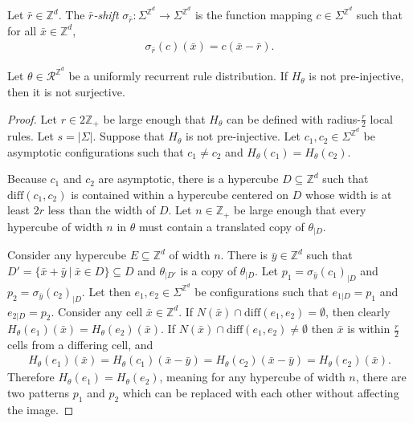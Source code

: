 \documentclass[runningheads]{llncs}
\newcommand{\Z}{\mathbb{Z}}
\newcommand{\set}[2]{\{ #1 \: | \: #2 \}}
\newcommand{\confspace}{\Sigma^{\Z^d}}
\begin{document}
\begin{definition}
Let $\bar r \in \Z^d$. The \emph{$\bar r$-shift} $\sigma_{\bar r}: \confspace \rightarrow \confspace$ is the function mapping $c\in \confspace$ such that for all $\bar x \in \Z^d$, 
\begin{align*}
\sigma_{\bar r} (c)(\bar x) = c(\bar x - \bar r).
\end{align*} 
\end{definition}

\begin{lemma} \label{goe_unif2}
Let $\theta \in \mathcal{R}^{\Z^d}$ be a uniformly recurrent rule distribution. If $H_\theta$ is not pre-injective, then it is not surjective.
\end{lemma}

\begin{proof}
Let $r\in 2\Z_+$ be large enough that $H_\theta$ can be defined with radius-$\frac{r}{2}$ local rules. Let $s = |\Sigma|$. Suppose that $H_\theta$ is not pre-injective. Let $c_1,c_2 \in \confspace$ be asymptotic configurations such that $c_1 \neq c_2$ and $H_\theta (c_1) = H_\theta (c_2)$.

Because $c_1$ and $c_2$ are asymptotic, there is a hypercube $D \subseteq \Z^d$ such that $\mathrm{diff}(c_1,c_2)$ is contained within a hypercube centered on $D$ whose width is at least $2r$ less than the width of $D$. Let $n\in \Z_+$ be large enough that every hypercube of width $n$ in $\theta$ must contain a translated copy of $\theta_{|D}$. 

Consider any hypercube $E \subseteq \Z^d$ of width $n$. There is $\bar{y} \in \Z^d$ such that $D' = \set{\bar{x} + \bar{y}}{\bar{x} \in D}  \subseteq D$ and $\theta_{|D'}$ is a copy of $\theta_{|D}$. Let $p_1 = \sigma_{\bar{y}} (c_1)_{|D}$ and $p_2 = \sigma_{\bar{y}} (c_2)_{|D}$. Let then $e_1,e_2 \in \confspace$ be configurations such that $e_{1|D} = p_1$ and $e_{2|D} = p_2$. Consider any cell $\bar{x} \in \Z^d$. If $N(\bar{x}) \cap \mathrm{diff}(e_1,e_2) = \emptyset$, then clearly $H_\theta (e_1) (\bar{x}) = H_\theta (e_2) (\bar{x})$. If $N(\bar{x}) \cap \mathrm{diff}(e_1,e_2) \neq \emptyset$ then $\bar{x}$ is within $\frac{r}{2}$ cells from a differing cell, and
\begin{align*}
H_\theta(e_1)(\bar{x}) = H_\theta (c_1)(\bar{x} - \bar{y}) = H_\theta (c_2)(\bar{x} - \bar{y}) = H_\theta(e_2)(\bar{x}).
\end{align*}
Therefore $H_\theta (e_1) = H_\theta (e_2)$, meaning for any hypercube of width $n$, there are two patterns $p_1$ and $p_2$ which can be replaced with each other without affecting the image.


\end{proof}
\end{document}
